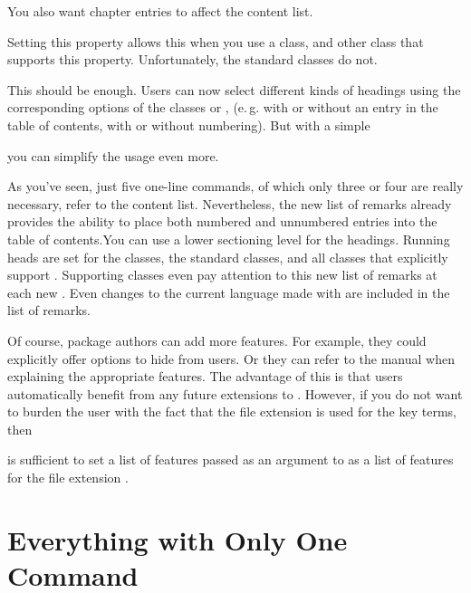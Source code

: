 You also want chapter entries to affect the content
list.
\begin{lstcode}
\end{lstcode}
Setting this property allows this when you use a \KOMAScript{} class, and other class
that supports this property. Unfortunately, the standard classes do not.

This should be enough. Users can now 
select different kinds of headings using the corresponding options of
the \KOMAScript{} classes or , (e.\,g. with
or without an entry in the table of contents, with or without numbering). But
with a simple
\begin{lstcode}
  \newcommand*{\listofremarkboxes}{\listoftoc{lor}}
\end{lstcode}
you can simplify the usage even more.

As you've seen, just five one-line commands, of which only three or four are
really necessary, refer to the content list. Nevertheless, the new list of
remarks already provides the ability to place both numbered and unnumbered
entries into the table of contents.You can use a lower sectioning level for
the headings. Running heads are set for the \KOMAScript{} classes, the
standard classes, and all classes that explicitly support .
Supporting classes even pay attention to this new list of remarks at each new
. Even changes to the current language made with
 are included in the list of remarks.

Of course, package authors can add more
features. For example, they could explicitly offer options to hide
 from users. Or they can refer to the
 manual when explaining the appropriate features. The
advantage of this is that users automatically benefit from any future
extensions to . However, if you do not want to burden the
user with the fact that the file extension  is used for the key
terms, then
\begin{lstcode}
  \newcommand*{\setupremarkboxes}{\setuptoc{lor}}
\end{lstcode}
is sufficient to set a list of features passed as an argument to
 as a list of features for the file extension
.

\section{Everything with Only One Command}
\label{sec:tocbasic.declarenewtoc}

